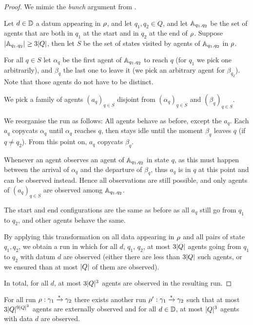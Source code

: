 \documentclass[a4paper,UKenglish,cleveref, autoref, thm-restate]{lipics-v2021}
\newcommand{\corto}[1]{\todo[color=blue!20]{\small #1}}
\begin{document}
	\begin{proof}
		We mimic the \emph{bunch} argument from \corto{ref}. 
		
		Let $d\in \mathbb{D}$ a datum appearing in $\rho$, and let $q_1, q_2 \in Q$, and let $\mathbb{A}_{q_1, q_2}$ be the set of agents that are both in $q_1$ at the start and in $q_2$ at the end of $\rho$. Suppose $|\mathbb{A}_{q_1, q_2}| \geq 3|Q|$, then let $S$ be the set of states visited by agents of $\mathbb{A}_{q_1, q_2}$ in $\rho$.
		
		For all $q \in S$ let $\alpha_q$ be the first agent of $\mathbb{A}_{q_1, q_2}$ to reach $q$ (for $q_1$ we pick one arbitrarily), and $\beta_q$ the last one to leave it (we pick an arbitrary agent for $\beta_{q_2}$). 
		Note that those agents do not have to be distinct.
		  
		We pick a family of agents $(a_q)_{q \in S}$ disjoint from $(\alpha_q)_{q \in S}$ and $(\beta_q)_{q \in S}$.
		
		We reorganise the run as follows: All agents behave as before, except the $a_q$. Each $a_q$ copycats $\alpha_q$ until $\alpha_q$ reaches $q$, then stays idle until the moment $\beta_q$ leaves $q$ (if $q \neq q_2$). From this point on, $a_q$ copycats $\beta_q$.
		
		Whenever an agent observes an agent of $\mathbb{A}_{q_1, q_2}$ in state $q$, as this must happen between the arrival of $\alpha_q$ and the departure of $\beta_q$, thus $a_q$ is in $q$ at this point and can be observed instead. Hence all observations are still possible, and only agents of $(a_{q})_{q\in S}$ are observed among $\mathbb{A}_{q_1, q_2}$.
		
		The start and end configurations are the same as before as all $a_q$ still go from $q_1$ to $q_2$, and other agents behave the same.
		
		By applying this transformation on all data appearing in $\rho$ and all pairs of state $q_1, q_2$, we obtain a run in which for all $d$, $q_1$, $q_2$, at most $3|Q|$ agents going from $q_1$ to $q_2$ with datum $d$ are observed (either there are less than $3|Q|$ such agents, or we ensured than at most $|Q|$ of them are observed).
		
		In total, for all $d$, at most $3|Q|^3$ agents are observed in the resulting run.
 	\end{proof}

	
	\begin{lemma}
		For all run $\rho : \gamma_1 \xrightarrow{*} \gamma_2$ there exists another run $\rho' : \gamma_1 \xrightarrow{*} \gamma_2$ such that at most $3|Q|^{9|Q|^3}$\corto{Tentative bound} agents are externally observed and for all $d \in \mathbb{D}$, at most $|Q|^3$ agents with data $d$ are observed.
	\end{lemma}
	 
\end{document}
